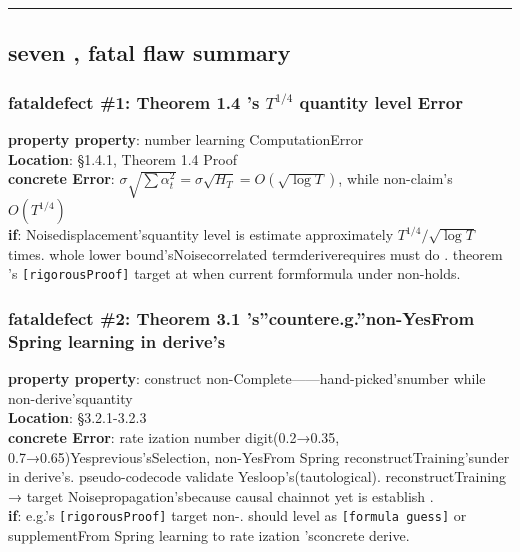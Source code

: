 \documentclass[
  12pt,
]{article}
\begin{document}
\begin{center}\rule{0.5\linewidth}{0.5pt}\end{center}

\subsection{seven , fatal flaw summary}\label{ux4e03ux81f4ux547dux7f3aux9677ux6c47ux603b}

\subsubsection{\texorpdfstring{fataldefect \#1: Theorem 1.4 's \(T^{1/4}\)
quantity level Error}{fataldefect \#1: Theorem 1.4 's T\^{}\{1/4\} quantity level Error}}\label{ux81f4ux547dux7f3aux9677-1-theorem-1.4-ux7684-t14-ux91cfux7ea7ux9519ux8bef}

\textbf{property property}: number learning ComputationError\\
\textbf{Location}: §1.4.1, Theorem 1.4 Proof\\
\textbf{concrete Error}:
\(\sigma\sqrt{\sum\alpha_t^2} = \sigma\sqrt{H_T} = O(\sqrt{\log T})\), while non-claim's
\(O(T^{1/4})\)\\
\textbf{if}: Noisedisplacement'squantity level is estimate approximately \(T^{1/4}/\sqrt{\log T}\)
times. whole lower bound'sNoisecorrelated termderiverequires must do . theorem 's \texttt{{[}rigorousProof{]}}
target at when current formformula under non-holds. 

\subsubsection{fataldefect \#2: Theorem 3.1 's''countere.g.''non-YesFrom Spring
learning in derive's}\label{ux81f4ux547dux7f3aux9677-2-theorem-3.1-ux7684ux53cdux4f8bux4e0dux662fux4ece-spring-ux52a8ux529bux5b66ux4e2dux63a8ux5bfcux7684}

\textbf{property property}: construct non-Complete------hand-picked'snumber while non-derive'squantity \\
\textbf{Location}: §3.2.1-3.2.3\\
\textbf{concrete Error}: rate ization number digit(0.2→0.35,
0.7→0.65)Yesprevious'sSelection, non-YesFrom Spring
reconstructTraining'sunder in derive's. pseudo-codecode validate Yesloop's(tautological). reconstructTraining
→ target Noisepropagation'sbecause causal chainnot yet is establish . \\
\textbf{if}: e.g.'s \texttt{{[}rigorousProof{]}} target non-. should level as 
\texttt{{[}formula guess{]}} or supplementFrom Spring learning to rate ization 'sconcrete derive. 
\end{document}
